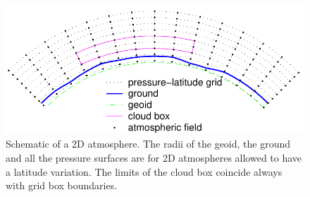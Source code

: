 \begin{figure}[!t]
 \begin{center}
  \includegraphics*[width=0.95\hsize]{Figs/fm_definitions/atm_dim_2d}
  \caption{ Schematic of a 2D atmosphere. The radii of the geoid, the ground
    and all the pressure surfaces are for 2D atmospheres allowed to
    have a latitude variation. The limits of the cloud box coincide
    always with grid box boundaries. }
  \label{fig:fm_defs:2d}
 \end{center}
\end{figure}


\label{sec:fm_defs:altitudes}

